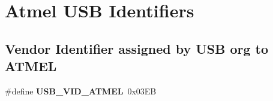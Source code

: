\hypertarget{group__usb__atmel__ids__group}{\section{Atmel U\-S\-B Identifiers}
\label{group__usb__atmel__ids__group}
}
\subsection*{Vendor Identifier assigned by U\-S\-B org to A\-T\-M\-E\-L}
\begin{DoxyCompactItemize}
\item 
\hypertarget{group__usb__atmel__ids__group_ga743cf21f96dd33b647482be549c304f7}{\#define {\bfseries U\-S\-B\-\_\-\-V\-I\-D\-\_\-\-A\-T\-M\-E\-L}~0x03\-E\-B}\label{group__usb__atmel__ids__group_ga743cf21f96dd33b647482be549c304f7}

\end{DoxyCompactItemize}

